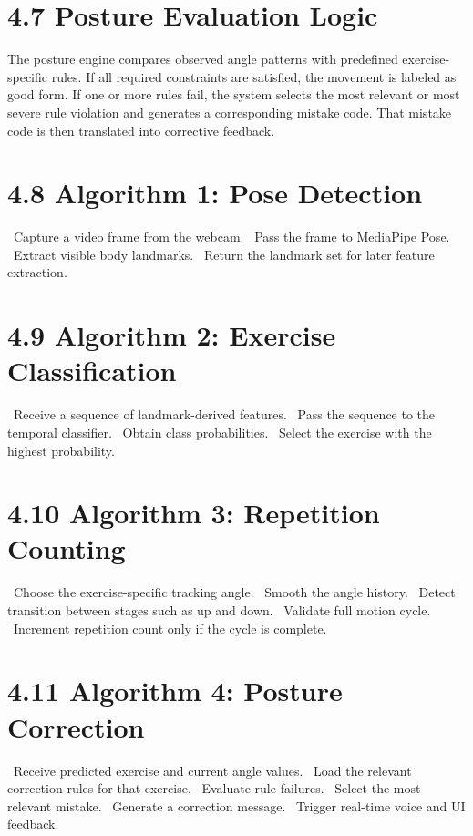 \documentclass[12pt,a4paper]{report}
\begin{document}
\section{4.7 Posture Evaluation Logic}
The posture engine compares observed angle patterns with predefined exercise-specific rules. If all required constraints are satisfied, the movement is labeled as good form. If one or more rules fail, the system selects the most relevant or most severe rule violation and generates a corresponding mistake code. That mistake code is then translated into corrective feedback.

\section{4.8 Algorithm 1: Pose Detection}
\noindent\textbullet\ Capture a video frame from the webcam.  
\noindent\textbullet\ Pass the frame to MediaPipe Pose.  
\noindent\textbullet\ Extract visible body landmarks.  
\noindent\textbullet\ Return the landmark set for later feature extraction.

\section{4.9 Algorithm 2: Exercise Classification}
\noindent\textbullet\ Receive a sequence of landmark-derived features.  
\noindent\textbullet\ Pass the sequence to the temporal classifier.  
\noindent\textbullet\ Obtain class probabilities.  
\noindent\textbullet\ Select the exercise with the highest probability.

\section{4.10 Algorithm 3: Repetition Counting}
\noindent\textbullet\ Choose the exercise-specific tracking angle.  
\noindent\textbullet\ Smooth the angle history.  
\noindent\textbullet\ Detect transition between stages such as up and down.  
\noindent\textbullet\ Validate full motion cycle.  
\noindent\textbullet\ Increment repetition count only if the cycle is complete.

\section{4.11 Algorithm 4: Posture Correction}
\noindent\textbullet\ Receive predicted exercise and current angle values.  
\noindent\textbullet\ Load the relevant correction rules for that exercise.  
\noindent\textbullet\ Evaluate rule failures.  
\noindent\textbullet\ Select the most relevant mistake.  
\noindent\textbullet\ Generate a correction message.  
\noindent\textbullet\ Trigger real-time voice and UI feedback.
\end{document}
